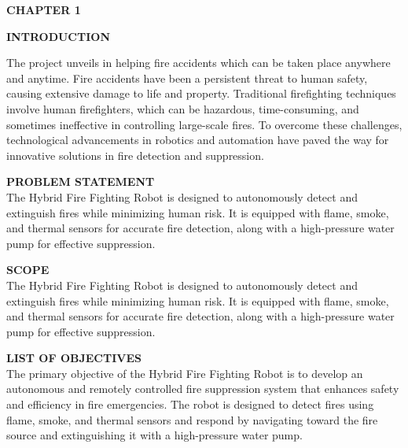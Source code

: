 \documentclass[12pt,a4paper]{article}
\begin{document}
\newpage

\pagestyle{fancy}
\fancyhead[L]{}  %
\fancyfoot{}
\fancyfoot[C]{\thepage}
\renewcommand{\footrulewidth}{1pt}

\begin{flushleft}
{\fontsize{16pt}{16pt}\selectfont \textbf{CHAPTER 1}}
\end{flushleft}		
\begin{center}
{\fontsize{18pt}{18pt}\selectfont \textbf{INTRODUCTION}}\\[1mm]
\end{center}
\onehalfspacing
\justifying \noindent The project unveils in helping fire accidents which can be taken place anywhere and anytime. Fire accidents have been a persistent threat to human safety, causing extensive damage to life and property. Traditional firefighting techniques involve human firefighters, which can be hazardous, time-consuming, and sometimes ineffective in controlling large-scale fires. To overcome these challenges, technological advancements in robotics and automation have paved the way for innovative solutions in fire detection and suppression. \\[2mm]
\begin{flushleft}
{\fontsize{14}{20}\selectfont\textbf{ PROBLEM STATEMENT}}\\[3mm]
\justifying \noindent The Hybrid Fire Fighting Robot is designed to autonomously detect and extinguish fires while 
minimizing human risk. It is equipped with flame, smoke, and thermal sensors for accurate fire detection, along with a high-pressure water pump for effective suppression. \\[2mm]
\end{flushleft}
\begin{flushleft}
{\fontsize{14}{20}\selectfont\textbf{ SCOPE}}\\[3mm]
\justifying \noindent The Hybrid Fire Fighting Robot is designed to autonomously detect and extinguish fires while 
minimizing human risk. It is equipped with flame, smoke, and thermal sensors for accurate fire detection, along with a high-pressure water pump for effective suppression. \\[2mm]
\end{flushleft}
\begin{flushleft}
{\fontsize{14}{20}\selectfont\textbf{ LIST OF OBJECTIVES} }	\\[3mm]
\justifying \noindent The primary objective of the Hybrid Fire Fighting Robot is to develop an autonomous and remotely 
controlled fire suppression system that enhances safety and efficiency in fire emergencies. The 
robot is designed to detect fires using flame, smoke, and thermal sensors and respond by navigating 
toward the fire source and extinguishing it with a high-pressure water pump. 	\\[2mm]
\end{flushleft}
\end{document}
